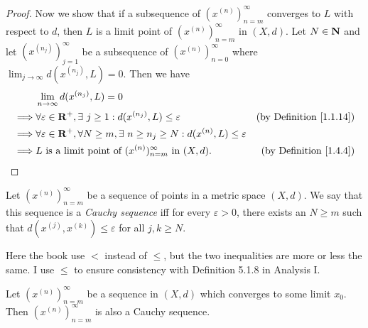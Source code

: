 \begin{proof}
    Now we show that if a subsequence of \((x^{(n)})_{n = m}^\infty\) converges to \(L\) with respect to \(d\), then \(L\) is a limit point of \((x^{(n)})_{n = m}^\infty\) in \((X, d)\).
    Let \(N \in \mathbf{N}\) and let \((x^{(n_j)})_{j = 1}^\infty\) be a subsequence of \((x^{(n)})_{n = 0}^\infty\) where \(\lim_{j \to \infty} d(x^{(n_j)}, L) = 0\).
    Then we have
    \begin{align*}
                 & \lim_{n \to \infty} d(x^{(n_j)}, L) = 0                                                                                                            \\
        \implies & \forall \varepsilon \in \mathbf{R}^+, \exists\ j \geq 1 : d(x^{(n_j)}, L) \leq \varepsilon                           & \text{(by Definition \ref{1.1.14})} \\
        \implies & \forall \varepsilon \in \mathbf{R}^+,  \forall N \geq m, \exists\ n \geq n_j \geq N : d(x^{(n)}, L) \leq \varepsilon                                       \\
        \implies & L \text{ is a limit point of } (x^{(n)})_{n = m}^\infty \text{ in } (X, d).                                  & \text{(by Definition \ref{1.4.4})}
    \end{align*}
\end{proof}

\begin{definition}\label{1.4.6}
    Let \((x^{(n)})_{n = m}^\infty\) be a sequence of points in a metric space \((X, d)\).
    We say that this sequence is a \emph{Cauchy sequence} iff for every \(\varepsilon > 0\), there exists an \(N \geq m\) such that \(d(x^{(j)}, x^{(k)}) \leq \varepsilon\) for all \(j, k \geq N\).
\end{definition}

\begin{note}
    Here the book use \(<\) instead of \(\leq\), but the two inequalities are more or less the same.
    I use \(\leq\) to ensure consistency with Definition 5.1.8 in Analysis I.
\end{note}

\begin{lemma}\label{1.4.7}
    Let \((x^{(n)})_{n = m}^\infty\) be a sequence in \((X, d)\) which converges to some limit \(x_0\).
    Then \((x^{(n)})_{n = m}^\infty\) is also a Cauchy sequence.
\end{lemma}


